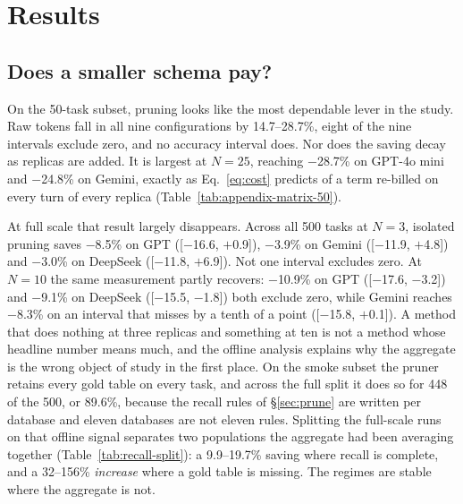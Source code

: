 \documentclass[conference]{IEEEtran}
\begin{document}
\section{Results}\label{sec:results}

\subsection{Does a smaller schema pay?}\label{sec:results-prune}

On the 50-task subset, pruning looks like the most dependable lever in the
study. Raw tokens fall in all nine configurations by 14.7--28.7\%, eight of the
nine intervals exclude zero, and no accuracy interval does. Nor does the saving
decay as replicas are added. It is largest at $N = 25$, reaching $-$28.7\%
on GPT-4o mini and $-$24.8\% on Gemini, exactly as Eq.~\ref{eq:cost} predicts of
a term re-billed on every turn of every replica
(Table~\ref{tab:appendix-matrix-50}).

At full scale that result largely disappears. Across all 500 tasks at $N = 3$,
isolated pruning saves $-$8.5\% on GPT ([$-$16.6, $+$0.9]), $-$3.9\% on Gemini
([$-$11.9, $+$4.8]) and $-$3.0\% on DeepSeek ([$-$11.8, $+$6.9]). Not one
interval excludes zero. At $N = 10$ the same measurement partly recovers:
$-$10.9\% on GPT ([$-$17.6, $-$3.2]) and $-$9.1\% on DeepSeek ([$-$15.5,
$-$1.8]) both exclude zero, while Gemini reaches $-$8.3\% on an interval that
misses by a tenth of a point ([$-$15.8, $+$0.1]). A method that does nothing at three replicas and something at ten is not a
method whose headline number means much, and the offline analysis explains why
the aggregate is the wrong object of study in the first place.
On the smoke subset the pruner retains every gold table on every task, and across
the full split it does so for 448 of the 500, or 89.6\%, because the recall rules
of §\ref{sec:prune} are written per database and eleven databases are not eleven
rules. Splitting the full-scale runs on that offline signal separates two
populations the aggregate had been averaging together
(Table~\ref{tab:recall-split}): a 9.9--19.7\% saving where recall is complete,
and a 32--156\% \emph{increase} where a gold table is missing. The regimes are
stable where the aggregate is not.
\end{document}
